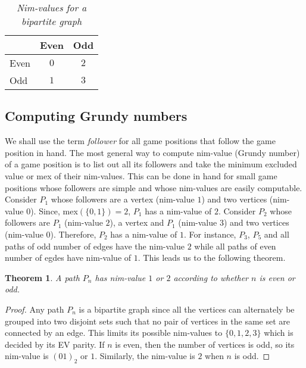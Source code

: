 \documentclass[a4paper, 12pt]{article}
\newtheorem{theorem}{Theorem}[section] %
\theoremstyle{remark} %
\begin{document}
\begingroup
\setlength{\tabcolsep}{8pt}
\renewcommand{\arraystretch}{1.5}
\begin{table}
	\begin{center}
		\caption{\textit{Nim-values for a bipartite graph}}
		\vspace*{0.2cm}
		\begin{tabular}{| l | c| c |}
			\hline
			\diagbox{Edges}{Vertices} & Even & Odd\\
			\hline
			Even & $0$ & $2$\\
			\hline
			Odd & $1$ & $3$\\
			\hline
		\end{tabular}
	\end{center}
\end{table}
\endgroup

\subsection{Computing Grundy numbers}

We shall use the term \textit{follower} for all game positions that follow the game position in hand. The most general way to compute nim-value (Grundy number) of a game position is to list out all its followers and take the minimum excluded value or mex of their nim-values. This can be done in hand for small game positions whose followers are simple and whose nim-values are easily computable. Consider $P_1$ whose followers are a vertex (nim-value $1$) and two vertices (nim-value $0$). Since, mex$(\{0,1\})= 2$, $P_1$ has a nim-value of $2$. Consider $P_2$ whose followers are $P_1$ (nim-value $2$), a vertex and $P_1$ (nim-value $3$) and two vertices (nim-value $0$). Therefore, $P_2$ has a nim-value of $1$. For instance, $P_3$, $P_5$ and all paths of odd number of edges have the nim-value $2$ while all paths of even number of egdes have nim-value of $1$. This leads us to the following theorem.

\begin{theorem}
	\label{nimValueTheoremForPaths}
	A path $P_n$ has nim-value $1$ or $2$ according to whether $n$ is even or odd.
\end{theorem}

\begin{proof}
	Any path $P_n$ is a bipartite graph since all the vertices can alternately be grouped into two disjoint sets such that no pair of vertices in the same set are connected by an edge. This limits its possible nim-values to $\{0,1,2,3\}$ which is decided by its EV parity. If $n$ is even, then the number of vertices is odd, so its nim-value is $(01)_2$ or $1$. Similarly, the nim-value is $2$ when $n$ is odd.
\end{proof}
\end{document}
